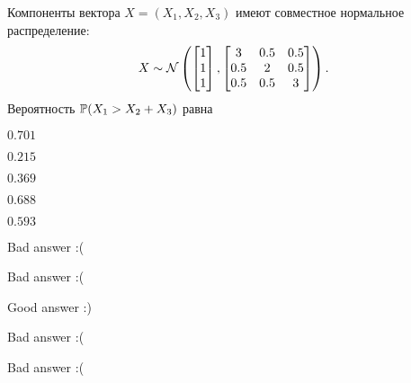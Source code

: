 
\begin{question}
Компоненты вектора \(X=(X_{1},X_{2},X_{3})\) имеют совместное нормальное
распределение: \[
X\sim\cN \left(
\begin{bmatrix}1\\1\\1\end{bmatrix},
\begin{bmatrix}3 & 0.5 & 0.5\\0.5 & 2 & 0.5\\0.5 & 0.5 & 3\end{bmatrix}
\right).
\] Вероятность \(\P(X_{1}>X_{2}+X_{3} )\) равна
\begin{answerlist}
  \item \(0.701\)
  \item \(0.215\)
  \item \(0.369\)
  \item \(0.688\)
  \item \(0.593\)
\end{answerlist}
\end{question}

\begin{solution}
\begin{answerlist}
  \item Bad answer :(
  \item Bad answer :(
  \item Good answer :)
  \item Bad answer :(
  \item Bad answer :(
\end{answerlist}
\end{solution}

